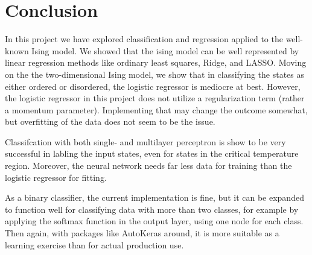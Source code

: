 \section{Conclusion}
In this project we have explored classification and regression applied to
the well-known Ising model. We showed that the ising model can be well
represented by linear regression methods like ordinary least squares,
Ridge, and LASSO. Moving on the the two-dimensional Ising model, we show that
in classifying the states as either ordered or disordered, the logistic
regressor is mediocre at best. However, the logistic regressor in this project 
does not utilize a regularization term (rather a momentum parameter).
Implementing that may change the outcome somewhat, but overfitting of the data
does not seem to be the issue.

Classifcation with both single- and multilayer perceptron is show to be very
successful in labling the input states, even for states in the critical
temperature region. Moreover, the neural network needs far less data for
training than the logistic regressor for fitting.

As a binary classifier, the current implementation is fine, but it can be 
expanded to function well for classifying data with more than two classes,
for example by applying the softmax function in the output layer, using
one node for each class. 
Then again, with packages like AutoKeras around, it is more suitable as
a learning exercise than for actual production use.
